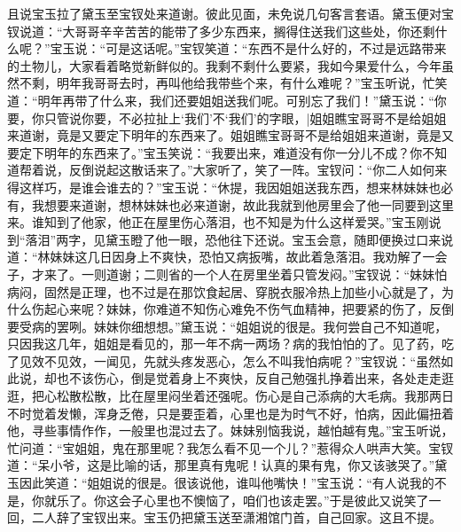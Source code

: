 且说宝玉拉了黛玉至宝钗处来道谢。彼此见面，未免说几句客言套语。黛玉便对宝钗说道：“大哥哥辛辛苦苦的能带了多少东西来，搁得住送我们这些处，你还剩什么呢？”宝玉说：“可是这话呢。”宝钗笑道：“东西不是什么好的，不过是远路带来的土物儿，大家看着略觉新鲜似的。我剩不剩什么要紧，我如今果爱什么，今年虽然不剩，明年我哥哥去时，再叫他给我带些个来，有什么难呢？”宝玉听说，忙笑道：“明年再带了什么来，我们还要姐姐送我们呢。可别忘了我们！”黛玉说：“你要，你只管说你要，不必拉扯上‘我们’不‘我们’的字眼，|姐姐瞧宝哥哥不是给姐姐来道谢，竟是又要定下明年的东西来了。姐姐瞧宝哥哥不是给姐姐来道谢，竟是又要定下明年的东西来了。”宝玉笑说：“我要出来，难道没有你一分儿不成？你不知道帮着说，反倒说起这散话来了。”大家听了，笑了一阵。宝钗问：“你二人如何来得这样巧，是谁会谁去的？”宝玉说：“休提，我因姐姐送我东西，想来林妹妹也必有，我想要来道谢，想林妹妹也必来道谢，故此我就到他房里会了他一同要到这里来。谁知到了他家，他正在屋里伤心落泪，也不知是为什么这样爱哭。”宝玉刚说到“落泪”两字，见黛玉瞪了他一眼，恐他往下还说。宝玉会意，随即便换过口来说道：“林妹妹这几日因身上不爽快，恐怕又病扳嘴，故此着急落泪。我劝解了一会子，才来了。一则道谢；二则省的一个人在房里坐着只管发闷。”宝钗说：“妹妹怕病闷，固然是正理，也不过是在那饮食起居、穿脱衣服冷热上加些小心就是了，为什么伤起心来呢？妹妹，你难道不知伤心难免不伤气血精神，把要紧的伤了，反倒要受病的罢咧。妹妹你细想想。”黛玉说：“姐姐说的很是。我何尝自己不知道呢，只因我这几年，姐姐是看见的，那一年不病一两场？病的我怕怕的了。见了药，吃了见效不见效，一闻见，先就头疼发恶心，怎么不叫我怕病呢？”宝钗说：“虽然如此说，却也不该伤心，倒是觉着身上不爽快，反自己勉强扎挣着出来，各处走走逛逛，把心松散松散，比在屋里闷坐着还强呢。伤心是自己添病的大毛病。我那两日不时觉着发懒，浑身乏倦，只是要歪着，心里也是为时气不好，怕病，因此偏扭着他，寻些事情作作，一般里也混过去了。妹妹别恼我说，越怕越有鬼。”宝玉听说，忙问道：“宝姐姐，鬼在那里呢？我怎么看不见一个儿？”惹得众人哄声大笑。宝钗道：“呆小爷，这是比喻的话，那里真有鬼呢！认真的果有鬼，你又该骇哭了。”黛玉因此笑道：“姐姐说的很是。很该说他，谁叫他嘴快！”宝玉说：“有人说我的不是，你就乐了。你这会子心里也不懊恼了，咱们也该走罢。”于是彼此又说笑了一回，二人辞了宝钗出来。宝玉仍把黛玉送至潇湘馆门首，自己回家。这且不提。


